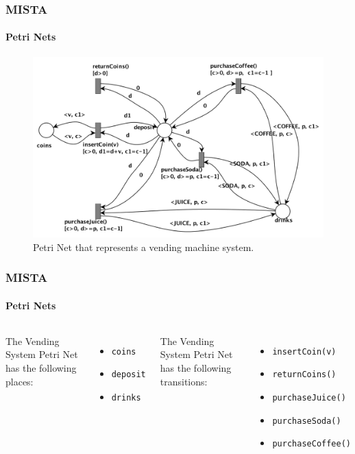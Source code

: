 \documentclass[notes]{beamer}
\begin{document}
\begin{frame}
  \vspace{-20.5pt}
  \frametitle{MISTA}
  \vspace{-20.5pt}
  \framesubtitle{Petri Nets}
  \begin{figure}
    \centering
    \includegraphics[scale=0.4]{petri-net.png}
    \caption{Petri Net that represents a vending machine system.}
    \label{fig:finite-state-machine}
  \end{figure}
\end{frame}

\begin{frame}
    \frametitle{MISTA}
    \framesubtitle{Petri Nets}
    \begin{columns}[t]
    The Vending System Petri Net has the following places:
    \begin{itemize}
        \item \texttt{coins}
        \item \texttt{deposit}
        \item \texttt{drinks}
    \end{itemize}
    The Vending System Petri Net has the following transitions:
    \begin{itemize}
        \item \texttt{insertCoin(v)}
        \item \texttt{returnCoins()}
        \item \texttt{purchaseJuice()}
        \item \texttt{purchaseSoda()}
        \item \texttt{purchaseCoffee()}
    \end{itemize}
    \end{columns}
\end{frame}
\end{document}
